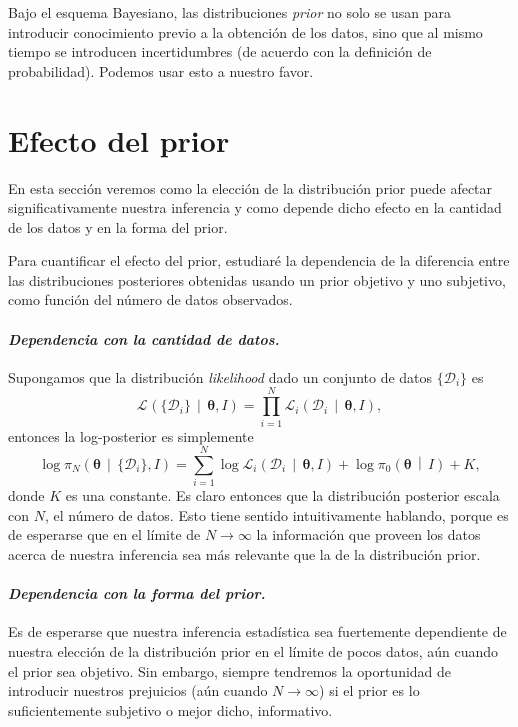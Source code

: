\documentclass[a4paper,twoside]{article}
\newcommand{\hip}{\ensuremath{\mathbold{\theta}}\xspace}
\newcommand{\dat}{\ensuremath{\{\mathcal{D}_i\}}\xspace}
\newcommand{\pos}[2]{\ensuremath{\pi_N\left(#1\,\middle|\, #2\right)}\xspace}
\newcommand{\pri}[2]{\ensuremath{\pi_0\left(#1\,\middle|\, #2\right)}\xspace}
\newcommand{\lik}[3][]{\ensuremath{\mathcal{L}_{#1}\left(#2\,\middle|\, #3\right)}\xspace}
\begin{document}
Bajo el esquema Bayesiano, las distribuciones \emph{prior} no solo se usan para introducir
conocimiento previo a la obtención de los datos, sino que al mismo tiempo se introducen
incertidumbres (de acuerdo con la definición de probabilidad). Podemos usar esto a nuestro favor.


\section{Efecto del prior}
%
En esta sección veremos como la elección de la distribución prior puede afectar significativamente
nuestra inferencia y como depende dicho efecto en la cantidad de los datos y en la forma del prior.

Para cuantificar el efecto del prior, estudiaré la dependencia de la diferencia entre las
distribuciones posteriores obtenidas usando un prior objetivo y uno subjetivo, como función del
número de datos observados.

\paragraph{\textit{\color{teal}Dependencia con la cantidad de datos.}} Supongamos que la
distribución \emph{likelihood} dado un conjunto de datos \(\dat\) es
%
\[\lik{\dat}{\hip,I} = \prod_{i=1}^N\lik[i]{\mathcal{D}_i}{\hip,I},\]
%
entonces la log-posterior es simplemente
%
\[\log{\pos{\hip}{\dat,I}} = \sum_{i=1}^N\log{\lik[i]{\mathcal{D}_i}{\hip,I}} + \log{\pri{\hip}{I}} + K,\]
%
donde \(K\) es una constante. Es claro entonces que la distribución posterior escala con \(N\), el
número de datos. Esto tiene sentido intuitivamente hablando, porque es de esperarse que en el límite
de \(N\to\infty\) la información que proveen los datos acerca de nuestra inferencia sea más
relevante que la de la distribución prior.

\paragraph{\textit{\color{teal}Dependencia con la forma del prior.}} Es de esperarse que nuestra
inferencia estadística sea fuertemente dependiente de nuestra elección de la distribución prior en
el límite de pocos datos, aún cuando el prior sea objetivo. Sin embargo, siempre tendremos la
oportunidad de introducir nuestros prejuicios (aún cuando \(N\to\infty\)) si el prior es lo
suficientemente subjetivo o mejor dicho, informativo.
\end{document}
